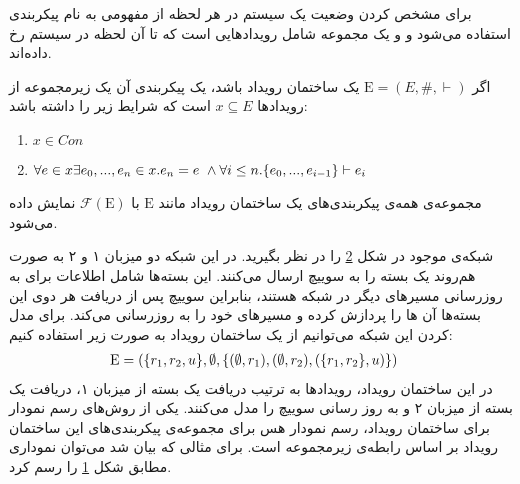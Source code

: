 برای مشخص کردن وضعیت یک سیستم در هر لحظه از مفهومی به نام پیکر‌بندی
استفاده می‌شود و
و یک مجموعه شامل رویدادهایی است که تا آن لحظه در سیستم رخ داده‌اند.
\begin{definition}
    اگر
    $\mathrm{E} = (E,\#,\vdash)$
    یک ساختمان رویداد باشد، یک پیکربندی آن یک زیرمجموعه از رویداد‌ها
    $x \subseteq E$
    است که شرایط زیر را داشته باشد:
    \begin{enumerate}
        \item $x \in Con$
        \item $\forall e \in x \exists e_0,...,e_n \in x. e_n = e \ \wedge
                  \forall i \leq n. \{e_0,...,e_{i-1}\} \vdash e_i$
    \end{enumerate}
\end{definition}
مجموعه‌ی همه‌ی پیکربندی‌های یک ساختمان رویداد مانند
$\mathrm{E}$
با
$\mathcal{F}(\mathrm{E})$
نمایش داده می‌شود.

شبکه‌ی موجود در شکل
\ref{fig:es:update}
را در نظر بگیرید.
در این شبکه دو میزبان ۱ و ۲ به صورت هم‌روند یک بسته را به سوییچ ارسال می‌کنند.
این بسته‌ها شامل اطلاعات برای به روزرسانی مسیر‌های دیگر در شبکه هستند، بنابراین سوییچ پس از دریافت هر دوی این بسته‌ها آن ها را پردازش کرده و مسیر‌های خود را به روزرسانی می‌کند.
برای مدل کردن این شبکه می‌توانیم از یک ساختمان رویداد به صورت زیر استفاده کنیم:
\begin{align*}
    \mathrm{E} & = (
    \{r_1,r_2,u\},
    \emptyset, \{(\emptyset,r_1),(\emptyset,r_2),(\{r_1,r_2\},u)\}
    )
\end{align*}
در این ساختمان رویداد، رویداد‌ها به ترتیب دریافت یک بسته از میزبان ۱، دریافت یک بسته از میزبان ۲ و به روز رسانی سوییچ را مدل می‌کنند.
یکی از روش‌های رسم نمودار برای ساختمان رویداد، رسم نمودار هس
برای مجموعه‌ی پیکربندی‌های این ساختمان رویداد بر اساس رابطه‌ی زیرمجموعه است.
برای مثالی که بیان شد می‌توان نموداری مطابق شکل
\ref{fig:es:configs}
را رسم کرد.
\begin{figure}
    \centering
    \caption{}
    \label{fig:es:configs}
\end{figure}

\begin{figure}
    \centering
    \caption{}
    \label{fig:es:update}
\end{figure}